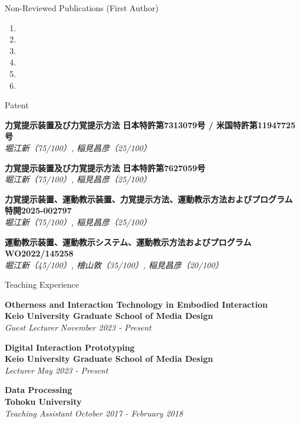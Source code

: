 \documentclass{resume} %
\begin{document}
\begin{rSection}{Non-Reviewed Publications (First Author)}
  \begin{enumerate}
    \item {}
    \item {}
    \item {}
    \item {}
    \item {}
    \item {}
  \end{enumerate}
\end{rSection}

\begin{rSection}{Patent}

{\bf 力覚提示装置及び力覚提示方法} \hfill {\bf 日本特許第7313079号 / 米国特許第11947725号}
\\{\em 堀江新（75/100）, 稲見昌彦（25/100）} \hfill {\em }

{\bf 力覚提示装置及び力覚提示方法} \hfill {\bf 日本特許第7627059号}
\\{\em 堀江新（75/100）, 稲見昌彦（25/100）} \hfill {\em }

{\bf 力覚提示装置、運動教示装置、力覚提示方法、運動教示方法およびプログラム} \hfill {\bf 特開2025-002797}
\\{\em 堀江新（75/100）, 稲見昌彦（25/100）} \hfill {\em }

{\bf 運動教示装置、運動教示システム、運動教示方法およびプログラム} \hfill {\bf WO2022/145258}
\\{\em 堀江新（45/100）, 檜山敦（35/100）, 稲見昌彦（20/100）} \hfill {\em }

\end{rSection}

\begin{rSection}{Teaching Experience}

{\bf Otherness and Interaction Technology in Embodied Interaction} 
\\{\bf Keio University Graduate School of Media Design} 
\\{\em Guest Lecturer} \hfill {\em November 2023 - Present}

{\bf Digital Interaction Prototyping} 
\\{\bf Keio University Graduate School of Media Design} 
\\{\em Lecturer} \hfill {\em May 2023 - Present}

{\bf Data Processing}
\\{\bf Tohoku University} 
\\{\em Teaching Assistant} \hfill {\em October 2017 - February 2018}

\end{rSection}
\end{document}
